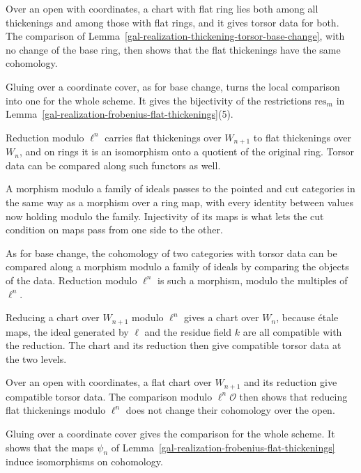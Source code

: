 Over an open with coordinates, a chart with flat ring lies both among all thickenings and among those with flat rings,
and it gives torsor data for both. The comparison of Lemma~\ref{gal-realization-thickening-torsor-base-change}, with no
change of the base ring, then shows that the flat thickenings have the same cohomology.

Gluing over a coordinate cover, as for base change, turns the local comparison into one for the whole scheme. It gives
the bijectivity of the restrictions $\mathrm{res}_m$ in Lemma~\ref{gal-realization-frobenius-flat-thickenings}(5).

Reduction modulo $\ell^n$ carries flat thickenings over $W_{n+1}$ to flat thickenings over $W_n$, and on rings it is an
isomorphism onto a quotient of the original ring. Torsor data can be compared along such functors as well.

A morphism modulo a family of ideals passes to the pointed and cut categories in the same way as a morphism over a ring
map, with every identity between values now holding modulo the family. Injectivity of its maps is what lets the cut
condition on maps pass from one side to the other.

As for base change, the cohomology of two categories with torsor data can be compared along a morphism modulo a family of
ideals by comparing the objects of the data. Reduction modulo $\ell^n$ is such a morphism, modulo the multiples of
$\ell^n$.

Reducing a chart over $W_{n+1}$ modulo $\ell^n$ gives a chart over $W_n$, because \'etale maps, the ideal generated by
$\ell$ and the residue field $k$ are all compatible with the reduction. The chart and its reduction then give
compatible torsor data at the two levels.

Over an open with coordinates, a flat chart over $W_{n+1}$ and its reduction give compatible torsor data. The comparison
modulo $\ell^n\mathcal O$ then shows that reducing flat thickenings modulo $\ell^n$ does not change their cohomology over
the open.

Gluing over a coordinate cover gives the comparison for the whole scheme. It shows that the maps $\psi_n$ of
Lemma~\ref{gal-realization-frobenius-flat-thickenings} induce isomorphisms on cohomology.

